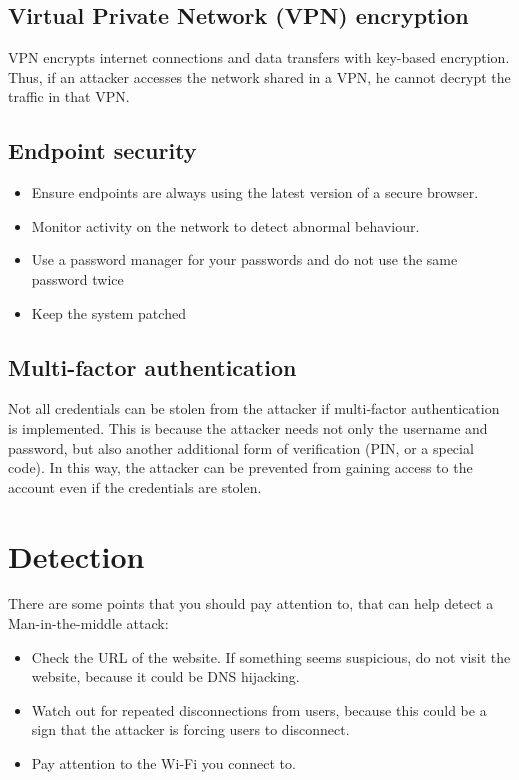 \subsection{Virtual Private Network (VPN) encryption}
VPN encrypts internet connections and data transfers with key-based encryption. Thus, if an attacker accesses the network shared in a VPN, he cannot decrypt the traffic in that VPN.
\subsection{Endpoint security}
\begin{itemize}
\item Ensure endpoints are always using the latest version of a secure browser.
\item Monitor activity on the network to detect abnormal behaviour.
\item Use a password manager for your passwords and do not use the same password twice
\item Keep the system patched
\end{itemize}

\subsection{Multi-factor authentication}
Not all credentials can be stolen from the attacker if multi-factor authentication is implemented. 
This is because the attacker needs not only the username and password, but also another additional form of verification (PIN, or a special code).
In this way, the attacker can be prevented from gaining access to the account even if the credentials are stolen.

\section{Detection}
There are some points that you should pay attention to, that can help detect a Man-in-the-middle attack:
\begin{itemize}
    \item Check the URL of the website. If something seems suspicious, do not visit the website, because it could be DNS hijacking.
    \item Watch out for repeated disconnections from users, because this could be a sign that the attacker is forcing users to disconnect.
    \item Pay attention to the Wi-Fi you connect to.
\end{itemize}

